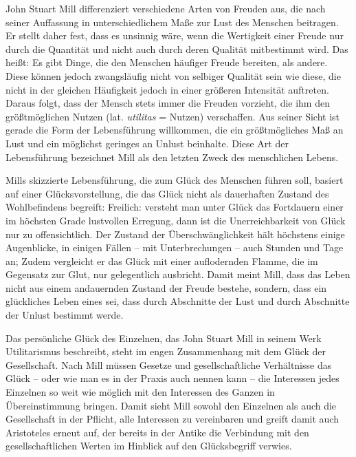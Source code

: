 John Stuart Mill differenziert verschiedene Arten von Freuden aus, die nach seiner Auffassung in unterschiedlichem Maße zur Lust des Menschen beitragen. 
Er stellt daher fest, dass es unsinnig wäre, wenn die Wertigkeit einer Freude nur durch die Quantität und nicht auch durch deren Qualität mitbestimmt wird\cite[S.\,15]{JM94}. 
Das heißt: Es gibt Dinge, die den Menschen häufiger Freude bereiten, als andere. 
Diese können jedoch zwangsläufig nicht von selbiger Qualität sein wie diese, die nicht in der gleichen Häufigkeit jedoch in einer größeren Intensität auftreten. 
Daraus folgt, dass der Mensch stets immer die Freuden vorzieht, die ihm den größtmöglichen Nutzen (lat. \textit{utilitas} = Nutzen) verschaffen. 
Aus seiner Sicht ist gerade die Form der Lebensführung willkommen, die ein größtmögliches Maß an Lust und ein möglichst geringes an Unlust beinhalte. 
Diese Art der Lebensführung bezeichnet Mill als den letzten Zweck des menschlichen Lebens\cite[S.\,21]{JM94}.

Mills skizzierte Lebensführung, die zum Glück des Menschen führen soll, basiert auf einer Glücksvorstellung, die das Glück nicht als dauerhaften Zustand des Wohlbefindens begreift: 
\glqq Freilich: versteht man unter Glück das Fortdauern einer im höchsten Grade lustvollen Erregung, dann ist die Unerreichbarkeit von Glück nur zu offensichtlich. 
Der Zustand der Überschwänglichkeit hält höchstens einige Augenblicke, in einigen Fällen -- mit Unterbrechungen -- auch Stunden und Tage an;\grqq{} \cite[S.\,23]{JM94}
 Zudem vergleicht er das Glück mit einer auflodernden Flamme, die im Gegensatz zur Glut, nur gelegentlich ausbricht. 
 Damit meint Mill, dass das Leben nicht aus einem andauernden Zustand der Freude bestehe, sondern, dass ein glückliches Leben eines sei, dass durch Abschnitte der Lust und durch Abschnitte der Unlust bestimmt werde.
 
Das persönliche Glück des Einzelnen, das John Stuart Mill in seinem Werk \glqq Utilitarismus\grqq{} beschreibt, steht im engen Zusammenhang mit dem Glück der Gesellschaft. 
Nach Mill müssen \glqq Gesetze und gesellschaftliche Verhältnisse das Glück -- oder wie man es in der Praxis auch nennen kann -- die Interessen jedes Einzelnen so weit wie möglich mit den Interessen des Ganzen in Übereinstimmung bringen.\grqq{} \cite[S.\,30]{JM94}
Damit sieht Mill sowohl den Einzelnen als auch die Gesellschaft in der Pflicht, alle Interessen zu vereinbaren und greift damit auch Aristoteles erneut auf, der bereits in der Antike die Verbindung mit den gesellschaftlichen Werten im Hinblick auf den Glücksbegriff verwies.

